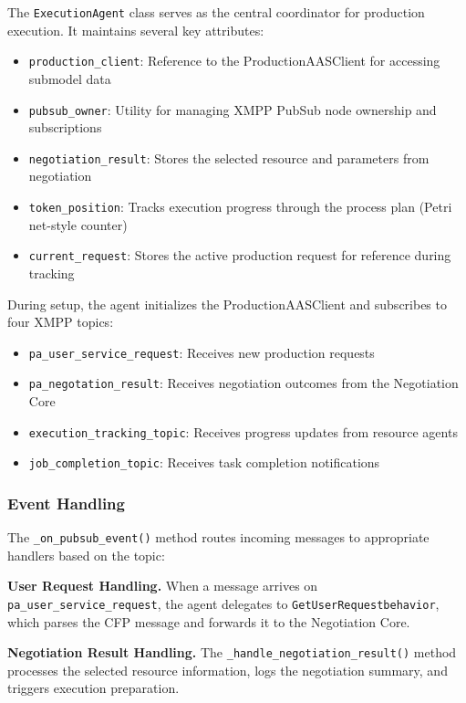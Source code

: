 The \texttt{ExecutionAgent} class serves as the central coordinator for production execution. It maintains several key attributes:

\begin{itemize}
    \item \texttt{production\_client}: Reference to the ProductionAASClient for accessing submodel data
    \item \texttt{pubsub\_owner}: Utility for managing \ac{XMPP} PubSub node ownership and subscriptions
    \item \texttt{negotiation\_result}: Stores the selected resource and parameters from negotiation
    \item \texttt{token\_position}: Tracks execution progress through the process plan (Petri net-style counter)
    \item \texttt{current\_request}: Stores the active production request for reference during tracking
\end{itemize}

During setup, the agent initializes the ProductionAASClient and subscribes to four \ac{XMPP} topics:
\begin{itemize}
    \item \texttt{pa\_user\_service\_request}: Receives new production requests
    \item \texttt{pa\_negotation\_result}: Receives negotiation outcomes from the Negotiation Core
    \item \texttt{execution\_tracking\_topic}: Receives progress updates from resource agents
    \item \texttt{job\_completion\_topic}: Receives task completion notifications
\end{itemize}

\subsubsection{Event Handling}

The \texttt{\_on\_pubsub\_event()} method routes incoming messages to appropriate handlers based on the topic:

\textbf{User Request Handling.} When a message arrives on \texttt{pa\_user\_service\_request}, the agent delegates to \texttt{GetUserRequestbehavior}, which parses the CFP message and forwards it to the Negotiation Core.

\textbf{Negotiation Result Handling.} The \texttt{\_handle\_negotiation\_result()} method processes the selected resource information, logs the negotiation summary, and triggers execution preparation.

